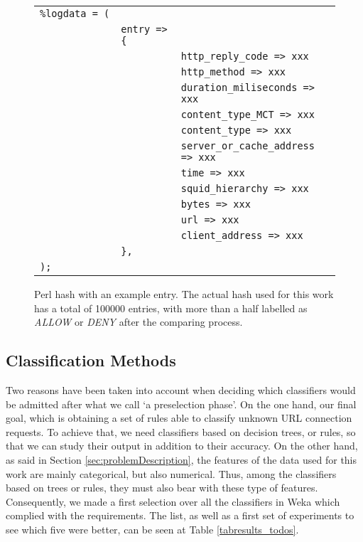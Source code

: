 \documentclass{llncs}
\begin{document}
\begin{figure}[htb]
\centering
\begin{tabular}{ p{0.1cm} p{0.1cm} p{6cm} }
  \texttt{\%logdata~=~(} & & \\
   & \texttt{entry~=>\{} & \\
   & & \texttt{http\_reply\_code => xxx} \\
   & & \texttt{http\_method => xxx} \\
   & & \texttt{duration\_miliseconds => xxx} \\
   & & \texttt{content\_type\_MCT => xxx} \\
   & & \texttt{content\_type => xxx} \\
   & & \texttt{server\_or\_cache\_address => xxx} \\
   & & \texttt{time => xxx} \\
   & & \texttt{squid\_hierarchy => xxx} \\
   & & \texttt{bytes => xxx} \\
   & & \texttt{url => xxx} \\
   & & \texttt{client\_address => xxx} \\
   & \texttt{\},} & \\
  \texttt{);} & & \\
\end{tabular}
\caption{Perl hash with an example entry. The actual hash used for this work has a total of 100000 entries, with more than a half labelled as \textit{ALLOW} or \textit{DENY} after the comparing process. \label{fig:data_hash}}
\end{figure}

%
\subsection{Classification Methods}
\label{subsec:methods}

\noindent Two reasons have been taken into account when deciding which classifiers would be admitted after what we call `a preselection phase'. On the one hand, our final goal, which is obtaining a set of rules able to classify unknown URL connection requests. To achieve that, we need classifiers based on decision trees, or rules, so that we can study their output in addition to their accuracy. On the other hand, as said in Section \ref{sec:problemDescription}, the features of the data used for this work are mainly categorical, but also numerical. Thus, among the classifiers based on trees or rules, they must also bear with these type of features. Consequently, we made a first selection over all the classifiers in Weka which complied with the requirements. The list, as well as a first set of experiments to see which five were better, can be seen at Table \ref{tabresults_todos}.
\end{document}
